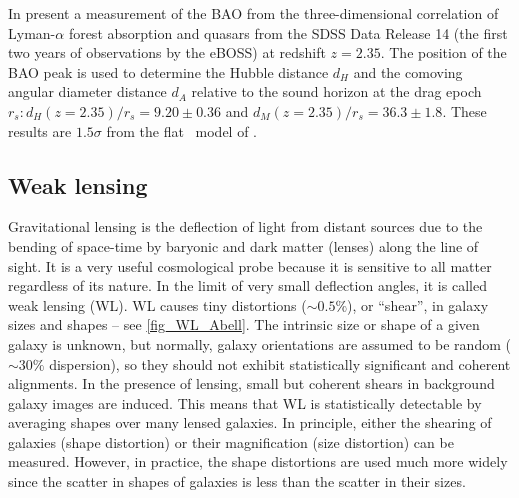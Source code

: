 In \textcite{BAO_results} present a measurement of the BAO from the three-dimensional correlation of Lyman-$\alpha$ forest absorption and quasars from the SDSS Data Release 14 (the first two years of observations by the eBOSS) at redshift $z=2.35$. The position of the BAO peak is used to determine the Hubble distance $d_H$ and the comoving angular diameter distance $d_A$ relative to the sound horizon at the drag epoch $r_s: d_H(z=2.35)/r_s = 9.20\pm0.36$ and $d_M(z=2.35)/r_s = 36.3\pm1.8$. These results are $1.5\sigma$ from the flat \LCDM\ model of \textcite{2016A&A...594A..13P}.
\subsection{Weak lensing}
Gravitational lensing is the deflection of light from distant sources due to the bending of space-time by baryonic and dark matter (lenses) along the line of sight. It is a very useful cosmological probe because it is sensitive to all matter regardless of its nature. In the limit of very small deflection angles, it is called weak lensing (WL). WL causes tiny distortions ($\sim0.5\%$), or ``shear'', in galaxy sizes and shapes -- see \autoref{fig_WL_Abell}. The intrinsic size or shape of a given galaxy is unknown, but normally, galaxy orientations are assumed to be random ($\sim30\%$ dispersion), so they should not exhibit statistically significant and coherent alignments. In the presence of lensing, small but coherent shears in background galaxy images are induced. This means that WL is statistically detectable by averaging shapes over many lensed galaxies. In principle, either the shearing of galaxies (shape distortion) or their magnification (size distortion) can be measured. However, in practice, the shape distortions are used much more widely since the scatter in shapes of galaxies is less than the scatter in their sizes.

